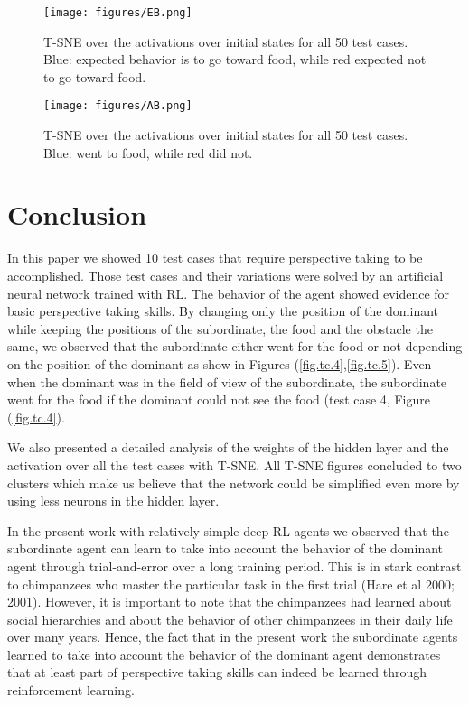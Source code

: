 \documentclass{article}
\begin{document}
\begin{figure}[H]
\texttt{[image: figures/EB.png]}
\caption{T-SNE over the activations over initial states for all 50 test cases. Blue: expected behavior is to go toward food, while red expected not to go toward food.}
\label{fig.expected.behavior}
\end{figure}
\begin{figure}[H]
\texttt{[image: figures/AB.png]}
\caption{T-SNE over the activations over initial states for all 50 test cases. Blue: went  to food, while red did not.}
\label{fig.actual.behavior}
\end{figure}

\section{Conclusion}
In this paper we showed 10 test cases that require perspective taking to be accomplished. Those test cases and their variations were solved by an artificial neural network trained with RL. The behavior of the agent showed evidence for basic perspective taking skills. By changing only the position of the dominant while keeping the positions of the subordinate, the food and the obstacle the same, we observed that the subordinate either went for the food or not depending on the position of the dominant as show in Figures (\ref{fig.tc.4},\ref{fig.tc.5}). Even when the dominant was in the field of view of the subordinate, the subordinate went for the food if the dominant could not see the food (test case 4, Figure (\ref{fig.tc.4}).  

We also presented a detailed analysis of the weights of the hidden layer and the activation over all the test cases with T-SNE. All T-SNE figures concluded to two clusters which make us believe that the network could be simplified even more by using less neurons in the hidden layer. 

In the present work with relatively simple deep RL agents we observed that the subordinate agent can learn to take into account the behavior of the dominant agent through trial-and-error over a long training period. This is in stark contrast to chimpanzees who master the particular task in the first trial  (Hare et al 2000; 2001). However, it is important to note that the chimpanzees had learned about social hierarchies and about the behavior of other chimpanzees in their daily life over many years. Hence, the fact that in the present work the subordinate agents learned to take into account the behavior of the dominant agent demonstrates that at least part of perspective taking skills can indeed be learned through reinforcement learning. 
\end{document}
